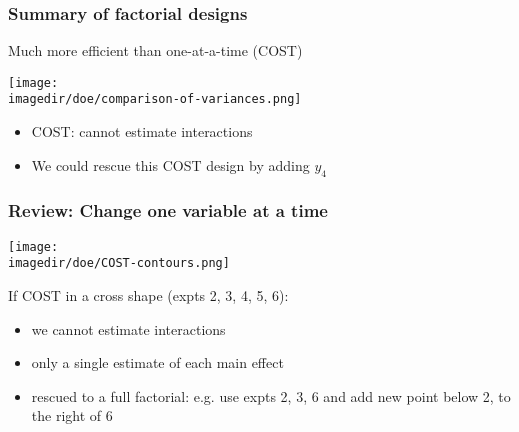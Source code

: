 \begin{frame}\frametitle{Summary of factorial designs}
	\begin{block}{Much more efficient than one-at-a-time (COST)}
		\begin{center}
			\texttt{[image: \\imagedir/doe/comparison-of-variances.png]}
		\end{center}
	\end{block}
	\begin{itemize}
		\item	COST: cannot estimate interactions
		\item	We could rescue this COST design by adding $y_4$
	\end{itemize}
\end{frame}

\begin{frame}\frametitle{Review: Change one variable at a time}
	\begin{center}
		\texttt{[image: \\imagedir/doe/COST-contours.png]}
	\end{center}
	If COST in a cross shape (expts 2, 3, 4, 5, 6):
	\begin{itemize}
		\item	we cannot estimate interactions
		\item	only a single estimate of each main effect
		\item	rescued to a full factorial: e.g. use expts 2, 3, 6 and add new point below 2, to the right of 6
	\end{itemize}
\end{frame}

